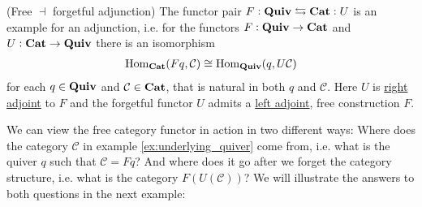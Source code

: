 \begin{definition}{(Free $\dashv$ forgetful adjunction)}
The functor pair $F : \mathrm{\textbf{Quiv}} \leftrightarrows \mathrm{\textbf{Cat}} : U$ is an example for an adjunction, i.e. for the functors $F : \mathrm{\textbf{Quiv}} \rightarrow \mathrm{\textbf{Cat}}$ and
$U : \mathrm{\textbf{Cat}} \rightarrow \mathrm{\textbf{Quiv}}$ there is an isomorphism
\begin{align}
\mathrm{Hom}_{\mathrm{\textbf{Cat}}}(Fq, \mathcal{C}) \cong \mathrm{Hom}_{\mathrm{\textbf{Quiv}}}(q,U\mathcal{C})
\end{align}
for each $q \in \mathrm{\textbf{Quiv}}$ and $\mathcal{C} \in \mathrm{\textbf{Cat}}$, that is natural in both $q$ and $\mathcal{C}$. Here $U$ is \ul{right adjoint} to $F$ and
the forgetful functor $U$ admits a \ul{left adjoint}, free construction $F$.
\end{definition}

We can view the free category functor in action in two different ways: Where does the category $\mathcal{C}$ in example \ref{ex:underlying_quiver}
come from, i.e. what is the quiver $q$ such that $\mathcal{C} = Fq$? And where does it go after we forget the category structure, i.e. what is
the category $F(U(\mathcal{C}))$? We will illustrate the answers to both questions in the next example:

